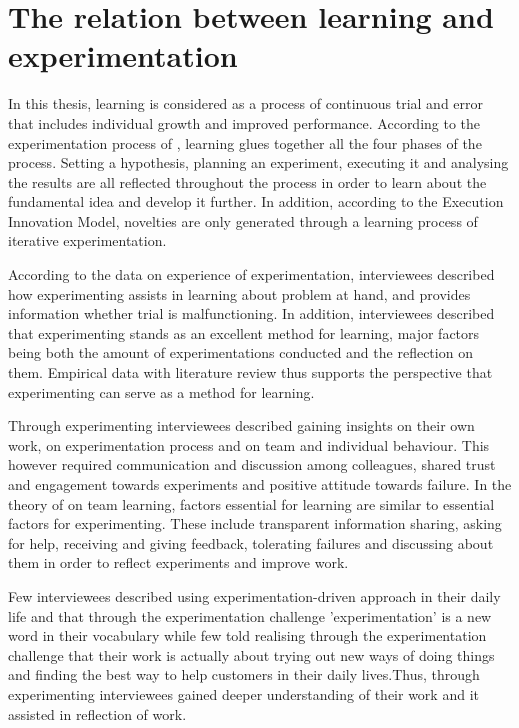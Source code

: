 \section{The relation between learning and experimentation} \label{relation}
In this thesis, learning is considered as a process of continuous trial and error \citep{argyris1978organizational,edmondson1999psychological} that includes individual growth and improved performance. According to the experimentation process of \citet{thomke1998managing}, learning glues together all the four phases of the process. Setting a hypothesis, planning an experiment, executing it and analysing the results are all reflected throughout the process in order to learn about the fundamental idea and develop it further. In addition, according to the Execution Innovation Model, novelties are only generated through a learning process of iterative experimentation. \citep{tuulenmaki2011art} 

According to the data on experience of experimentation, interviewees described how experimenting assists in learning about problem at hand, and provides information whether trial is malfunctioning. In addition, interviewees described that experimenting stands as an excellent method for learning, major factors being both the amount of experimentations conducted and the reflection on them. Empirical data with literature review thus supports the perspective that experimenting can serve as a method for learning. 

Through experimenting interviewees described gaining insights on their own work, on experimentation process and on team and individual behaviour. This however required communication and discussion among colleagues, shared trust and engagement towards experiments and positive attitude towards failure. In the theory of \citet{edmondson1999psychological} on team learning, factors essential for learning are similar to essential factors for experimenting. These include transparent information sharing, asking for help, receiving and giving feedback, tolerating failures and discussing about them in order to reflect experiments and improve work. 

Few interviewees described using experimentation-driven approach in their daily life and that through the experimentation challenge 'experimentation' is a new word in their vocabulary while few told realising through the experimentation challenge that their work is actually about trying out new ways of doing things and finding the best way to help customers in their daily lives.Thus, through experimenting interviewees gained deeper understanding of their work and it assisted in reflection of work. 

